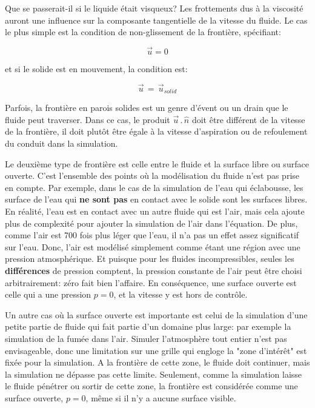 \documentclass[11pt]{report}
\begin{document}
Que se passerait-il si le liquide était visqueux? Les frottements dus à la viscosité auront une influence sur la composante tangentielle de la vitesse du fluide. Le cas le plus simple est la condition de non-glissement de la frontière, spécifiant:

\begin{equation}
\overrightarrow{u} = 0
\end{equation}

et si le solide est en mouvement, la condition est:

\begin{equation}
\overrightarrow{u} \,=\, \overrightarrow{u}\!\!_{solid}
\end{equation}

Parfois, la frontière en parois solides est un genre d'évent ou un drain que le fluide peut traverser. Dans ce cas, le produit $ \overrightarrow{u}\,.\,\hat{n} $ doit être différent de la vitesse de la frontière, il doit plutôt être égale à la vitesse d'aspiration ou de refoulement du conduit dans la simulation.\newline


Le deuxième type de frontière est celle entre le fluide et la surface libre ou surface ouverte. C'est l'ensemble des points où la modélisation du fluide n'est pas prise en compte. Par exemple, dans le cas de la simulation de l'eau qui éclabousse, les surface de l'eau qui \textbf{ne sont pas} en contact avec le solide sont les surfaces libres. En réalité, l'eau est en contact avec un autre fluide qui est l'air, mais cela ajoute plus de complexité  pour ajouter la simulation de l'air dans l'équation. De plus, comme l'air est 700 fois plus léger que l'eau, il n'a pas un effet assez significatif sur l'eau. Donc, l'air est modélisé simplement comme étant une région avec une pression atmosphérique. Et puisque pour les fluides incompressibles, seules les \textbf{ différences} de pression comptent, la pression constante de l'air peut être choisi arbitrairement: zéro fait bien l'affaire. En conséquence, une surface ouverte est celle qui a une pression $ p = 0 $, et la vitesse y est hors de contrôle.\newline

Un autre cas où la surface ouverte est importante est celui de la simulation d'une petite partie de fluide qui fait partie d'un domaine plus large: par exemple la simulation de la fumée dans l'air. Simuler l'atmosphère tout entier n'est pas envisageable, donc une limitation sur une grille qui engloge la "zone d'intérêt" est fixée pour la simulation. A la frontière de cette zone, le fluide doit continuer, mais la simulation ne dépasse pas cette limite. Seulement, comme la simulation laisse le fluide pénétrer ou sortir de cette zone, la frontière est considérée comme une surface ouverte, $ p = 0 $, même si il n'y a aucune surface visible.\newline
\end{document}
